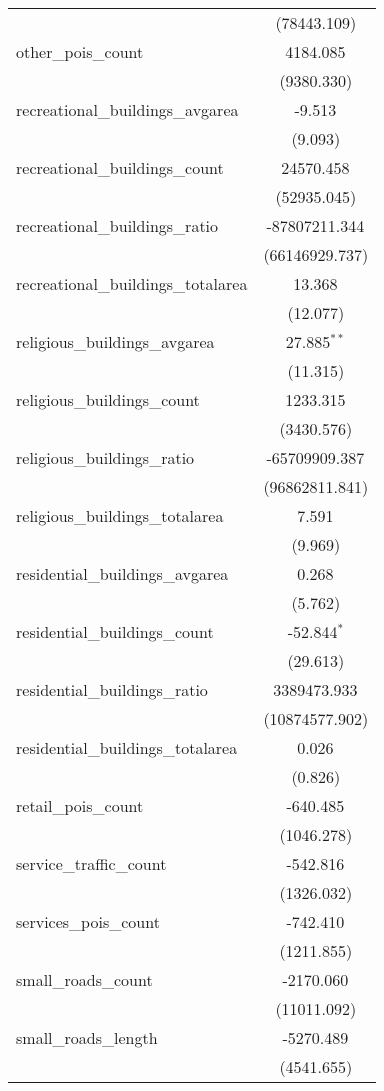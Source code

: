 \begin{table}[!htbp]
\begin{tabular}{@{\extracolsep{5pt}}lc}
  & (78443.109) \\
 other_pois_count & 4184.085$^{}$ \\
  & (9380.330) \\
 recreational_buildings_avgarea & -9.513$^{}$ \\
  & (9.093) \\
 recreational_buildings_count & 24570.458$^{}$ \\
  & (52935.045) \\
 recreational_buildings_ratio & -87807211.344$^{}$ \\
  & (66146929.737) \\
 recreational_buildings_totalarea & 13.368$^{}$ \\
  & (12.077) \\
 religious_buildings_avgarea & 27.885$^{**}$ \\
  & (11.315) \\
 religious_buildings_count & 1233.315$^{}$ \\
  & (3430.576) \\
 religious_buildings_ratio & -65709909.387$^{}$ \\
  & (96862811.841) \\
 religious_buildings_totalarea & 7.591$^{}$ \\
  & (9.969) \\
 residential_buildings_avgarea & 0.268$^{}$ \\
  & (5.762) \\
 residential_buildings_count & -52.844$^{*}$ \\
  & (29.613) \\
 residential_buildings_ratio & 3389473.933$^{}$ \\
  & (10874577.902) \\
 residential_buildings_totalarea & 0.026$^{}$ \\
  & (0.826) \\
 retail_pois_count & -640.485$^{}$ \\
  & (1046.278) \\
 service_traffic_count & -542.816$^{}$ \\
  & (1326.032) \\
 services_pois_count & -742.410$^{}$ \\
  & (1211.855) \\
 small_roads_count & -2170.060$^{}$ \\
  & (11011.092) \\
 small_roads_length & -5270.489$^{}$ \\
  & (4541.655) \\

\end{tabular}
\end{table}
